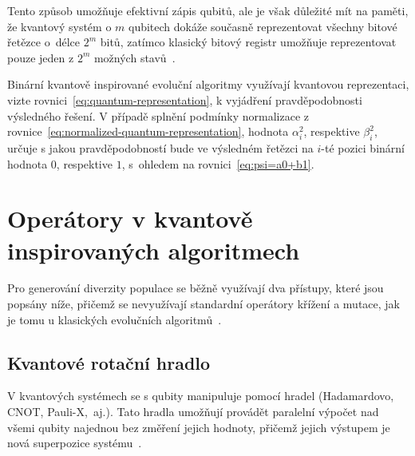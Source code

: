 Tento způsob umožňuje efektivní zápis qubitů, ale je však důležité mít na paměti, že kvantový systém o $m$ qubitech dokáže současně reprezentovat všechny bitové řetězce o~délce $2^m$ bitů, zatímco klasický bitový registr umožňuje reprezentovat pouze jeden z $2^m$ možných stavů~\cite{NaturalComputing}. 

Binární kvantově inspirované evoluční algoritmy využívají kvantovou reprezentaci, vizte rovnici~\ref{eq:quantum-representation}, k vyjádření pravděpodobnosti výsledného řešení. 
V případě splnění podmínky normalizace z rovnice~\ref{eq:normalized-quantum-representation}, hodnota $\alpha^2_i$, respektive $\beta^2_i$, určuje s jakou pravděpodobností bude ve výsledném řetězci na $i$-té pozici binární hodnota $0$, respektive $1$, s~ohledem na rovnici~\ref{eq:psi=a0+b1}.

\section{Operátory v kvantově inspirovaných algoritmech}
Pro generování diverzity populace se běžně využívají dva přístupy, které jsou popsány níže, přičemž se nevyužívají standardní operátory křížení a mutace, jak je tomu u klasických evolučních algoritmů~\cite{NaturalComputing}.

\subsection{Kvantové rotační hradlo}\label{subsec:quantum-gates}
V kvantových systémech se s qubity manipuluje pomocí hradel (Hadamardovo, CNOT, Pauli-X,~aj.). 
Tato hradla umožňují provádět paralelní výpočet nad všemi qubity najednou bez změření jejich hodnoty, přičemž jejich výstupem je nová superpozice systému~\cite{NaturalComputing,QuantumComputing-Curious,QuantumComputing-QuantumInformation}. 

